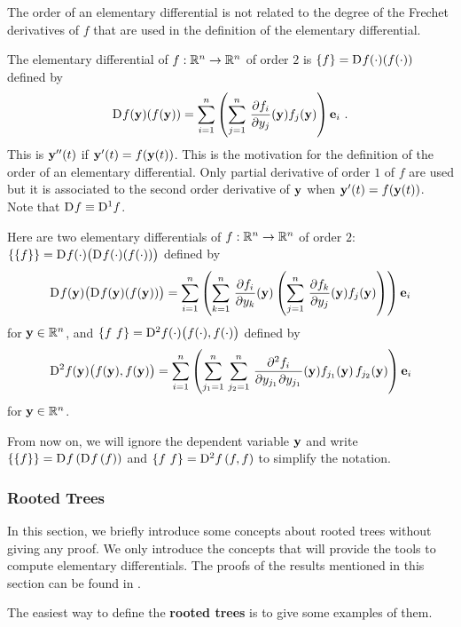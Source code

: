 The order of an elementary differential is not related to the degree
of the Frechet derivatives of $f$ that are used in the definition of the
elementary differential.

\begin{egg}
The elementary differential of $f:\RR^n \to \RR^n$ of order $2$ is
$\{f\} = \fdiff{f}{}(\cdot) (f(\cdot))$ defined by
\[
\fdiff{f}{}(\VEC{y})( f(\VEC{y})) =
\sum_{i=1}^n \left(\sum_{j=1}^n\,
\pdydx{f_i}{y_j}(\VEC{y}) f_j(\VEC{y}) \right) \VEC{e}_i \ .
\]
This is $\VEC{y}''(t)$ if $\VEC{y}'(t) = f(\VEC{y}(t))$.  This is the
motivation for the definition of the order of an elementary
differential.  Only partial derivative of order $1$ of $f$ are used
but it is associated to the second order derivative of $\VEC{y}$ when
$\VEC{y}'(t) = f(\VEC{y}(t))$.  Note that $\fdiff{f}{} \equiv \fdiff{f}{1}$.

Here are two elementary differentials of $f:\RR^n \to \RR^n$ of order
$2$:\\
$\{\{f\}\} = \fdiff{f}{}(\cdot)\big( \fdiff{f}{}(\cdot) (f(\cdot)) \big)$
defined by
\[
\fdiff{f}{}(\VEC{y})\big( \fdiff{f}{}(\VEC{y}) (f(\VEC{y})) \big)
= \sum_{i=1}^n \left(  \sum_{k=1}^n\,
\pdydx{f_i}{y_k}(\VEC{y}) \left(\sum_{j=1}^n\,
\pdydx{f_k}{y_j}(\VEC{y}) f_j(\VEC{y}) \right) \right) \VEC{e}_i
\]
for $\VEC{y} \in \RR^n$, and
$\{f \ f \} = \fdiff{f}{2}(\cdot)\big( f(\cdot) , f(\cdot) \big)$
defined by
\[
\fdiff{f}{2}(\VEC{y})\big( f(\VEC{y}), f(\VEC{y}) \big)
= \sum_{i=1}^n \left(  \sum_{j_1=1}^n\,\sum_{j_2=1}^n\,
\pdydxnm{f_i}{y_{j_1}}{y_{j_1}}{2}{}{}(\VEC{y}) f_{j_1}(\VEC{y})\,
f_{j_2}(\VEC{y}) \right) \VEC{e}_i
\]
for $\VEC{y} \in \RR^n$.

From now on, we will ignore the dependent variable $\VEC{y}$ and write
$\{\{f\}\} = \fdiff{f}{}\,(\fdiff{f}{}\,(f))$ and
$\{f \ f\} = \fdiff{f}{2}\,(f,f)$ to simplify the notation.
\end{egg}

\subsubsection{Rooted Trees}\label{TreeSSSection}

In this section, we briefly introduce some concepts about rooted trees
without giving any proof.  We only introduce the concepts that will
provide the tools to compute elementary differentials.  The proofs of
the results mentioned in this section can be found in \cite{La}.

The easiest way to define the {\bfseries rooted trees}
is to give some examples of them. 

